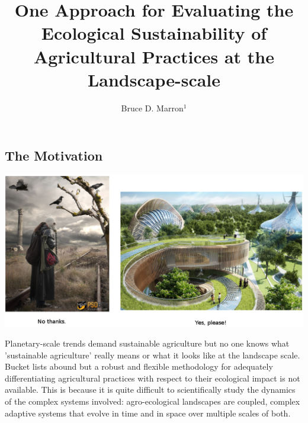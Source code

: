 \documentclass[noback]{psuposter}
\begin{document}
\title{\Huge One Approach for Evaluating the Ecological Sustainability of Agricultural Practices at the Landscape-scale}
\author{Bruce D. Marron$^1$}
\address{$^1$Portland State University, USA.}

\makeposter

\subsection{The Motivation}
\centerline{\includegraphics[width=20cm]{figs/Image1c.eps}}

Planetary-scale trends demand sustainable agriculture but no one knows what 'sustainable agriculture' really means or what it looks like at the landscape scale.  Bucket lists abound but a robust and flexible methodology for adequately differentiating agricultural practices with respect to their ecological impact is not available. This is because it is quite difficult to scientifically study the dynamics of the complex systems involved:  agro-ecological landscapes are coupled, complex adaptive systems that evolve in time and in space over multiple scales of both.
\end{document}
